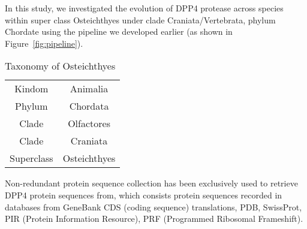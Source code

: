 In this study, we investigated the evolution of DPP4 protease across species within super class Osteichthyes under clade Craniata/Vertebrata, phylum Chordate using the pipeline we developed earlier (as shown in Figure~\ref{fig:pipeline}). 

\begin{table} 
\caption{\label{table:Tax} Taxonomy of Osteichthyes~\cite{18563158}} 
\centering
    \begin{tabular}{| c | c |}
    \hline
        Kindom & Animalia \\ 
        Phylum & Chordata \\ 
        Clade & Olfactores \\ 
        Clade & Craniata \\ 
        Superclass &  Osteichthyes\\ 
    \hline
    \end{tabular} 
\end{table}

Non-redundant protein sequence collection has been exclusively used to retrieve DPP4 protein sequences from, which consists protein sequences recorded in databases from GeneBank CDS (coding sequence) translations, PDB, SwissProt, PIR (Protein Information Resource), PRF (Programmed Ribosomal Frameshift). 